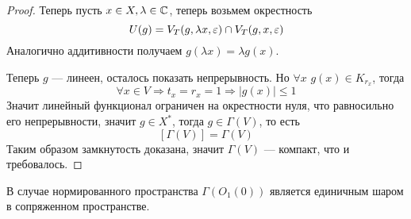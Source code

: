 \begin{proof}
	Теперь пусть $x \in X, \lambda \in \mathbb{C}$, теперь возьмем окрестность 
	$$
	U(g) = V_T(g,\lambda x, \varepsilon) \cap V_T(g,x,\varepsilon)
	$$
	Аналогично аддитивности получаем $g(\lambda x) = \lambda g(x)$. 
	
	Теперь $g$ --- линеен, осталось показать непрерывность. Но $\forall x$ $g(x) \in K_{r_x}$, тогда 
	$$
	\forall x \in V \Rightarrow t_x = r_x = 1 \Rightarrow |g(x)| \leq 1
	$$
	Значит линейный функционал ограничен на окрестности нуля, что равносильно его непрерывности, значит $g \in X^*$, тогда $g \in \Gamma(V)$, то есть 
	$$
	[\Gamma(V)] = \Gamma(V)
	$$
	Таким образом замкнутость доказана, значит $\Gamma(V)$ --- компакт, что и требовалось.
\end{proof} 
\begin{remark}
	В случае нормированного пространства $\Gamma(O_1(0))$ является единичным шаром в сопряженном пространстве. 
\end{remark}